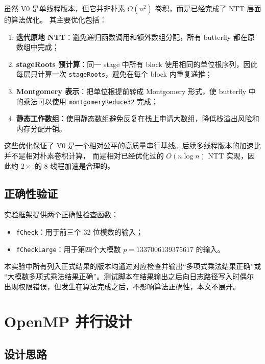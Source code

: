 \documentclass[UTF8,a4paper,10pt]{ctexart}
\begin{document}
虽然 V0 是单线程版本，但它并非朴素 $O(n^2)$ 卷积，而是已经完成了 NTT 层面的算法优化。
其主要优化包括：

\begin{enumerate}
  \item \textbf{迭代原地 NTT}：避免递归函数调用和额外数组分配，所有 butterfly 都在原数组中完成；
  \item \textbf{stageRoots 预计算}：同一 stage 中所有 block 使用相同的单位根序列，因此每层只计算一次
        \texttt{stageRoots}，避免在每个 block 内重复递推；
  \item \textbf{Montgomery 表示}：把单位根提前转成 Montgomery 形式，使 butterfly 中的乘法可以使用
        \texttt{montgomeryReduce32} 完成；
  \item \textbf{静态工作数组}：使用静态数组避免反复在栈上申请大数组，降低栈溢出风险和内存分配开销。
\end{enumerate}

这些优化保证了 V0 是一个相对公平的高质量串行基线。后续多线程版本的加速比并不是相对朴素卷积计算，
而是相对已经优化过的 $O(n\log n)$ NTT 实现，因此约 $2\times$ 的 8 线程加速是合理的。

\subsection{正确性验证}

实验框架提供两个正确性检查函数：

\begin{itemize}
  \item \texttt{fCheck}：用于前三个 32 位模数的输入；
  \item \texttt{fCheckLarge}：用于第四个大模数 $p = 1337006139375617$ 的输入。
\end{itemize}

本实验中所有列入正式结果的版本均通过对应检查并输出``多项式乘法结果正确''或
``大模数多项式乘法结果正确''。测试脚本在结果输出之后向日志路径写入时偶尔
出现权限错误，但发生在算法完成之后，不影响算法正确性，本文不展开。

\section{OpenMP 并行设计}

\subsection{设计思路}
\end{document}
